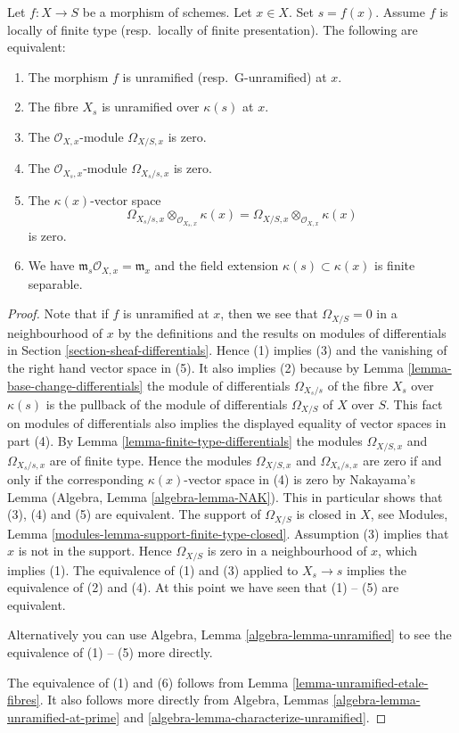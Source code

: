 \begin{lemma}
\label{lemma-unramified-at-point}
Let $f : X \to S$ be a morphism of schemes.
Let $x \in X$.
Set $s = f(x)$.
Assume $f$ is locally of finite type (resp.\ locally of finite presentation).
The following are equivalent:
\begin{enumerate}
\item The morphism $f$ is unramified (resp.\ G-unramified) at $x$.
\item The fibre $X_s$ is unramified over $\kappa(s)$ at $x$.
\item The $\mathcal{O}_{X, x}$-module $\Omega_{X/S, x}$ is zero.
\item The $\mathcal{O}_{X_s, x}$-module $\Omega_{X_s/s, x}$ is zero.
\item The $\kappa(x)$-vector space
$$
\Omega_{X_s/s, x} \otimes_{\mathcal{O}_{X_s, x}} \kappa(x) =
\Omega_{X/S, x} \otimes_{\mathcal{O}_{X, x}} \kappa(x)
$$
is zero.
\item We have $\mathfrak m_s\mathcal{O}_{X, x} = \mathfrak m_x$
and the field extension $\kappa(s) \subset \kappa(x)$ is finite
separable.
\end{enumerate}
\end{lemma}

\begin{proof}
Note that if $f$ is unramified at $x$, then
we see that $\Omega_{X/S} = 0$ in a neighbourhood of $x$
by the definitions and the results on modules of differentials
in Section \ref{section-sheaf-differentials}. Hence (1) implies
(3) and the vanishing of the right hand vector space in (5).
It also implies (2) because by
Lemma \ref{lemma-base-change-differentials}
the module of differentials $\Omega_{X_s/s}$ of the fibre $X_s$
over $\kappa(s)$ is the pullback of the module of differentials
$\Omega_{X/S}$ of $X$ over $S$. This fact on modules of differentials
also implies the displayed equality of vector spaces in part (4). By
Lemma \ref{lemma-finite-type-differentials}
the modules $\Omega_{X/S, x}$ and $\Omega_{X_s/s, x}$ are of finite type.
Hence the modules $\Omega_{X/S, x}$ and $\Omega_{X_s/s, x}$ are zero if and only
if the corresponding $\kappa(x)$-vector space in (4) is zero by
Nakayama's Lemma
(Algebra, Lemma \ref{algebra-lemma-NAK}).
This in particular shows that (3), (4) and (5) are equivalent.
The support of $\Omega_{X/S}$ is closed in $X$, see
Modules, Lemma \ref{modules-lemma-support-finite-type-closed}.
Assumption (3) implies that $x$ is not in the support.
Hence $\Omega_{X/S}$ is zero in a neighbourhood of $x$, which
implies (1). The equivalence of (1) and (3) applied to $X_s \to s$
implies the equivalence of (2) and (4).
At this point we have seen that (1) -- (5) are equivalent.

\medskip\noindent
Alternatively you can use Algebra, Lemma \ref{algebra-lemma-unramified}
to see the equivalence of (1) -- (5) more directly.

\medskip\noindent
The equivalence of (1) and (6) follows from Lemma
\ref{lemma-unramified-etale-fibres}.
It also follows more directly from
Algebra, Lemmas \ref{algebra-lemma-unramified-at-prime} and
\ref{algebra-lemma-characterize-unramified}.
\end{proof}

